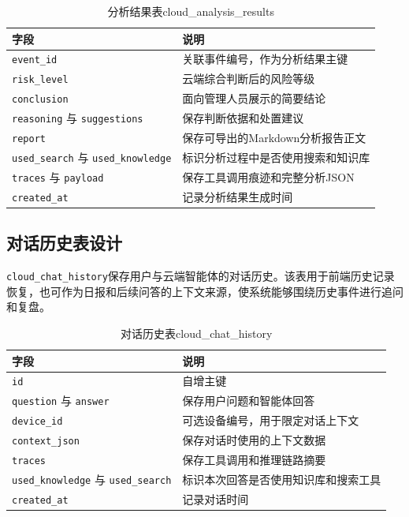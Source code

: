 \begin{table}[H]
\caption{分析结果表cloud\_analysis\_results}
\begin{center}
\begin{tabular}{lp{9.5cm}}
\toprule
字段 & 说明 \\
\midrule
\texttt{event\_id} & 关联事件编号，作为分析结果主键 \\
\texttt{risk\_level} & 云端综合判断后的风险等级 \\
\texttt{conclusion} & 面向管理人员展示的简要结论 \\
\texttt{reasoning} 与 \texttt{suggestions} & 保存判断依据和处置建议 \\
\texttt{report} & 保存可导出的Markdown分析报告正文 \\
\texttt{used\_search} 与 \texttt{used\_knowledge} & 标识分析过程中是否使用搜索和知识库 \\
\texttt{traces} 与 \texttt{payload} & 保存工具调用痕迹和完整分析JSON \\
\texttt{created\_at} & 记录分析结果生成时间 \\
\bottomrule
\end{tabular}
\end{center}
\label{tb:db-analysis}
\end{table}

\subsection{对话历史表设计}

\verb|cloud_chat_history|保存用户与云端智能体的对话历史。该表用于前端历史记录恢复，也可作为日报和后续问答的上下文来源，使系统能够围绕历史事件进行追问和复盘。

\begin{table}[H]
\caption{对话历史表cloud\_chat\_history}
\begin{center}
\begin{tabular}{lp{9.5cm}}
\toprule
字段 & 说明 \\
\midrule
\texttt{id} & 自增主键 \\
\texttt{question} 与 \texttt{answer} & 保存用户问题和智能体回答 \\
\texttt{device\_id} & 可选设备编号，用于限定对话上下文 \\
\texttt{context\_json} & 保存对话时使用的上下文数据 \\
\texttt{traces} & 保存工具调用和推理链路摘要 \\
\texttt{used\_knowledge} 与 \texttt{used\_search} & 标识本次回答是否使用知识库和搜索工具 \\
\texttt{created\_at} & 记录对话时间 \\
\bottomrule
\end{tabular}
\end{center}
\label{tb:db-chat}
\end{table}

